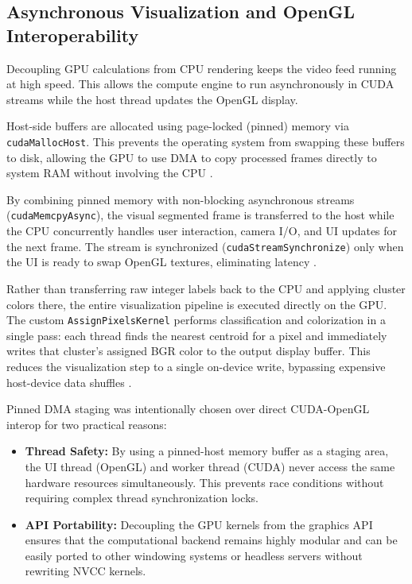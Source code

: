 \subsection{Asynchronous Visualization and OpenGL Interoperability}
Decoupling GPU calculations from CPU rendering keeps the video feed running at high speed. This allows the compute engine to run asynchronously in CUDA streams while the host thread updates the OpenGL display.

Host-side buffers are allocated using page-locked (pinned) memory via \texttt{cuda\allowbreak MallocHost}. This prevents the operating system from swapping these buffers to disk, allowing the GPU to use DMA to copy processed frames directly to system RAM without involving the CPU \cite{CudaGuide}. 

By combining pinned memory with non-blocking asynchronous streams (\texttt{cudaMemcpyAsync}), the visual segmented frame is transferred to the host while the CPU concurrently handles user interaction, camera I/O, and UI updates for the next frame. The stream is synchronized (\texttt{cudaStreamSynchronize}) only when the UI is ready to swap OpenGL textures, eliminating latency \cite{CudaGuide, cook2012cuda}.

Rather than transferring raw integer labels back to the CPU and applying cluster colors there, the entire visualization pipeline is executed directly on the GPU. The custom \texttt{AssignPixelsKernel} performs classification and colorization in a single pass: each thread finds the nearest centroid for a pixel and immediately writes that cluster's assigned BGR color to the output display buffer. This reduces the visualization step to a single on-device write, bypassing expensive host-device data shuffles \cite{CudaGuide, cook2012cuda}.

Pinned DMA staging was intentionally chosen over direct CUDA-OpenGL interop for two practical reasons:

\newpage
\begin{itemize}
    \item \textbf{Thread Safety:} By using a pinned-host memory buffer as a staging area, the UI thread (OpenGL) and worker thread (CUDA) never access the same hardware resources simultaneously. This prevents race conditions without requiring complex thread synchronization locks.
    \item \textbf{API Portability:} Decoupling the GPU kernels from the graphics API ensures that the computational backend remains highly modular and can be easily ported to other windowing systems or headless servers without rewriting NVCC kernels.
\end{itemize}

